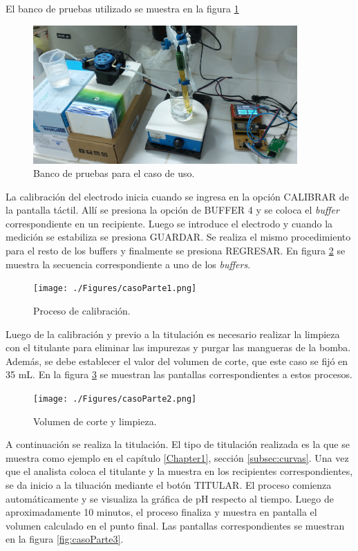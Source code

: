 El banco de pruebas utilizado se muestra en la figura \ref{fig:bancoPruebasCompleto}

\begin{figure}[htbp]
	\centering
	\includegraphics[width=0.9\textwidth]{./Figures/casoTitulacion.jpg}
	\caption{Banco de pruebas para el caso de uso.}
	\label{fig:bancoPruebasCompleto}
\end{figure}

La calibración del electrodo inicia cuando se ingresa en la opción CALIBRAR de la pantalla táctil. Allí se presiona la opción de BUFFER 4 y se coloca el \textit{buffer} correspondiente en un recipiente. Luego se introduce el electrodo y cuando la medición se estabiliza se presiona GUARDAR. Se realiza el mismo procedimiento para el resto de los buffers y finalmente se presiona REGRESAR. En figura \ref{fig:casoParte1} se muestra la secuencia correspondiente a uno de los \textit{buffers}.

\begin{figure}[htbp]
	\centering
	\texttt{[image: ./Figures/casoParte1.png]}
	\caption{Proceso de calibración.}
	\label{fig:casoParte1}
\end{figure}

Luego de la calibración y previo a la titulación es necesario realizar la limpieza con el titulante para eliminar las impurezas y purgar las mangueras de la bomba. Además, se debe establecer el valor del volumen de corte, que este caso se fijó en 35 mL. En la figura \ref{fig:casoParte2} se muestran las pantallas correspondientes a estos procesos.

\begin{figure}[htbp]
	\centering
	\texttt{[image: ./Figures/casoParte2.png]}
	\caption{Volumen de corte y limpieza.}
	\label{fig:casoParte2}
\end{figure}

A continuación se realiza la titulación. El tipo de titulación realizada es la que se muestra como ejemplo en el capítulo \ref{Chapter1}, sección \ref{subsec:curvas}. Una vez que el analista coloca el titulante y la muestra en los recipientes correspondientes, se da inicio a la tiluación mediante el botón TITULAR. El proceso comienza automáticamente y se visualiza la gráfica de pH respecto al tiempo. Luego de aproximadamente 10 minutos, el proceso finaliza y muestra en pantalla el volumen calculado en el punto final. Las pantallas correspondientes se muestran en la figura \ref{fig:casoParte3}.

